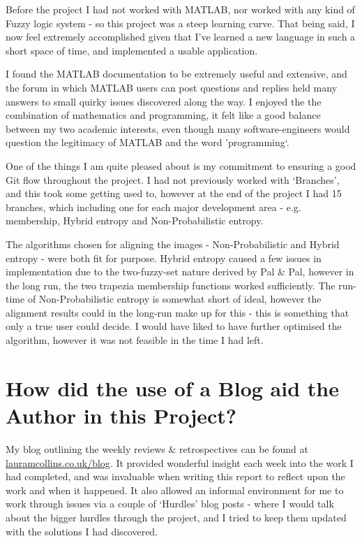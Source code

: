 Before the project I had not worked with MATLAB, nor worked with any kind of Fuzzy logic system - so this project was a steep learning curve. That being said, I now feel extremely accomplished given that I've learned a new language in such a short space of time, and implemented a usable application.

I found the MATLAB documentation to be extremely useful and extensive, and the forum in which MATLAB users can post questions and replies held many answers to small quirky issues discovered along the way. I enjoyed the the combination of mathematics and programming, it felt like a good balance between my two academic interests, even though many software-engineers would question the legitimacy of MATLAB and the word 'programming`.

One of the things I am quite pleased about is my commitment to ensuring a good Git flow throughout the project. I had not previously worked with `Branches', and this took some getting used to, however at the end of the project I had 15 branches, which including one for each major development area - e.g. membership, Hybrid entropy and Non-Probabilistic entropy.

The algorithms chosen for aligning the images - Non-Probabilistic and Hybrid entropy - were both fit for purpose. Hybrid entropy caused a few issues in implementation due to the two-fuzzy-set nature derived by Pal \& Pal, however in the long run, the two trapezia membership functions worked sufficiently. The run-time of Non-Probabilistic entropy is somewhat short of ideal, however the alignment results could in the long-run make up for this - this is something that only a true user could decide. I would have liked to have further optimised the algorithm, however it was not feasible in the time I had left.

\section{How did the use of a Blog aid the Author in this Project?}
\label{sec:blog}

My blog outlining the weekly reviews \& retrospectives can be found at \url{lauramcollins.co.uk/blog}. It provided wonderful insight each week into the work I had completed, and was invaluable when writing this report to reflect upon the work and when it happened. It also allowed an informal environment for me to work through issues via a couple of `Hurdles' blog posts - where I would talk about the bigger hurdles through the project, and I tried to keep them updated with the solutions I had discovered.

